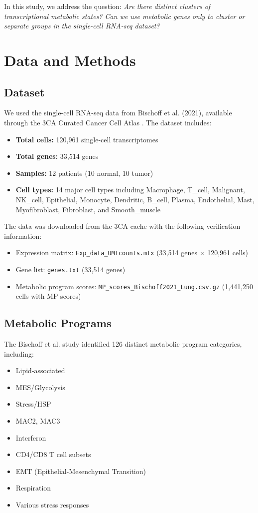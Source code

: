 \documentclass[11pt,a4paper]{article}
\begin{document}
In this study, we address the question: \textit{Are there distinct clusters of transcriptional metabolic states? Can we use metabolic genes only to cluster or separate groups in the single-cell RNA-seq dataset?}

\section{Data and Methods}

\subsection{Dataset}

We used the single-cell RNA-seq data from Bischoff et al. (2021), available through the 3CA Curated Cancer Cell Atlas \cite{bischoff2021single}. The dataset includes:
\begin{itemize}
    \item \textbf{Total cells:} 120,961 single-cell transcriptomes
    \item \textbf{Total genes:} 33,514 genes
    \item \textbf{Samples:} 12 patients (10 normal, 10 tumor)
    \item \textbf{Cell types:} 14 major cell types including Macrophage, T\_cell, Malignant, NK\_cell, Epithelial, Monocyte, Dendritic, B\_cell, Plasma, Endothelial, Mast, Myofibroblast, Fibroblast, and Smooth\_muscle
\end{itemize}

The data was downloaded from the 3CA cache with the following verification information:
\begin{itemize}
    \item Expression matrix: \texttt{Exp\_data\_UMIcounts.mtx} (33,514 genes $\times$ 120,961 cells)
    \item Gene list: \texttt{genes.txt} (33,514 genes)
    \item Metabolic program scores: \texttt{MP\_scores\_Bischoff2021\_Lung.csv.gz} (1,441,250 cells with MP scores)
\end{itemize}

\subsection{Metabolic Programs}

The Bischoff et al. study identified 126 distinct metabolic program categories, including:
\begin{itemize}
    \item Lipid-associated
    \item MES/Glycolysis
    \item Stress/HSP
    \item MAC2, MAC3
    \item Interferon
    \item CD4/CD8 T cell subsets
    \item EMT (Epithelial-Mesenchymal Transition)
    \item Respiration
    \item Various stress responses
\end{itemize}
\end{document}
